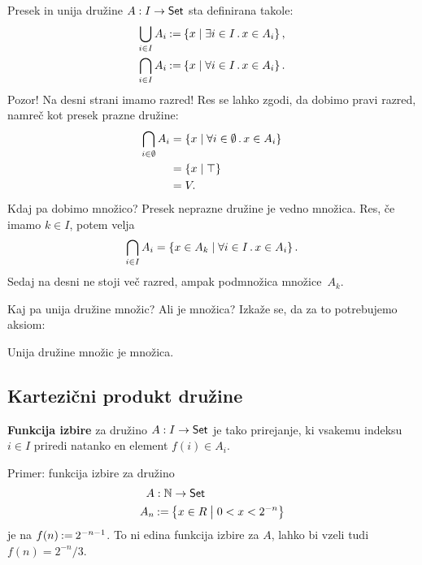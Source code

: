 Presek in unija družine $A : I \to \mathsf{Set}$ sta definirana takole:
%
\begin{align*}
  \bigcup_{i \in I} A_i &\mathbin{{:}{=}} \left\{ x \; \middle| \; \exists i \in I \,.\, x \in A_i \right\},
  \\
  \bigcap_{i \in I} A_i &\mathbin{{:}{=}} \left\{ x \; \middle| \; \forall  i \in I \,.\, x \in A_i \right\}.
\end{align*}
%
Pozor! Na desni strani imamo razred! Res se lahko zgodi, da dobimo pravi razred, namreč
kot presek prazne družine:
%
\begin{align*}
  \bigcap_{i \in \emptyset} A_i
  &= \left\{ x \; \middle| \; \forall  i \in \emptyset \,.\, x \in A_i \right\} \\
  &= \left\{ x \; \middle| \; \top \right\} \\
  &= V.
\end{align*}
%
Kdaj pa dobimo množico? Presek neprazne družine je vedno množica. Res, če imamo
$k \in I$, potem velja
%
\begin{equation*}
    \bigcap_{i \in I} A_i = \left\{ x \in A_k \; \middle| \; \forall i \in I \,.\, x \in A_i\right\}.
\end{equation*}
%
Sedaj na desni ne stoji več razred, ampak podmnožica množice~$A_k$.

Kaj pa unija družine množic? Ali je množica? Izkaže se, da za to potrebujemo aksiom:

\begin{aksiom}
  Unija družine množic je množica.
\end{aksiom}


\subsection{Kartezični produkt družine}

\begin{definicija}
  \textbf{Funkcija izbire} za družino $A : I \to \mathsf{Set}$ je tako prirejanje, ki vsakemu indeksu $i \in I$ priredi natanko en element $f(i) \in A_i$.
 \end{definicija}

 \begin{zgled}
   Primer: funkcija izbire za družino
   \begin{align*}
   A &: \mathbb{N} \to \mathsf{Set} \\
   A_n &\mathbin{{:}{=}} \left\{ x \in R \; \middle| \; 0 < x < 2^{-n} \right\}
   \end{align*}
   je na $f(n) \mathbin{{:}{=}} 2^{-n - 1}$. To ni edina funkcija izbire za $A$, lahko bi vzeli tudi $f(n) = 2^{-n} / 3$.
 \end{zgled}

